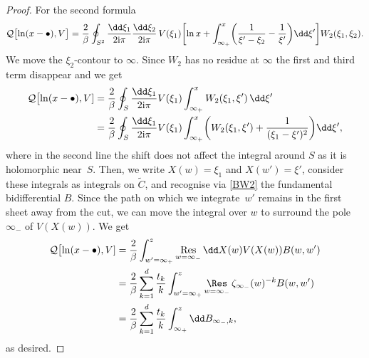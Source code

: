 \documentclass[pdftex]{sigma}
\numberwithin{equation}{section}
\begin{document}
\begin{proof}
For the second formula
\begin{equation*}
\mathcal{Q}\bigl[\ln(x - \bullet),V\bigr] = \frac{2}{\beta} \oint_{S^2} \frac{\dd \xi_1}{2{\rm i}\pi} \frac{\dd\xi_2}{2{\rm i}\pi}\,V(\xi_1)\biggl[\ln x + \int_{\infty_+}^{x} \biggl(\frac{1}{\xi' - \xi_2} - \frac{1}{\xi'}\biggr)\dd \xi'\biggr] W_2(\xi_1,\xi_2).
\end{equation*}
We move the $\xi_2$-contour to $\infty$. Since $W_2$ has no residue at $\infty$ the first and third term disappear and we get
\begin{align*}
\mathcal{Q}\bigl[\ln(x - \bullet),V] &{} = \frac{2}{\beta} \oint_{S} \frac{\dd \xi_1}{2{\rm i}\pi} V(\xi_1) \int_{\infty_+}^{x} W_2(\xi_1,\xi') \,\dd \xi' \\
&{} =\frac{2}{\beta} \oint_{S} \frac{\dd \xi_1}{2{\rm i}\pi} V(\xi_1) \int_{\infty_+}^{x} \biggl(W_2(\xi_1,\xi') + \frac{1}{(\xi_1 - \xi')^2}\biggr)\dd \xi',
\end{align*}
where in the second line the shift does not affect the integral around $S$ as it is holomorphic near~$S$. Then, we write $X(w) = \xi_1$ and $X(w') = \xi'$, consider these integrals as integrals on $\widetilde{C}$, and recognise via \eqref{BW2} the fundamental bidifferential $B$. Since the path on which we integrate~$w'$ remains in the first sheet away from the cut, we can move the integral over $w$ to surround the pole $\infty_-$ of $V(X(w))$. We get
\begin{align*}
\mathcal{Q}\bigl[\ln(x - \bullet),V] &{} = \frac{2}{\beta} \int_{w' = \infty_+}^{z} \mathop{{\rm Res}}_{w = \infty_-} \dd X(w)V(X(w))B(w,w') \\
&{} = \frac{2}{\beta} \sum_{k = 1}^{d} \frac{t_k}{k} \int_{w' = \infty_+}^{z} \mathop{{\rm \Res}}_{w = \infty_-} \zeta_{\infty_-}(w)^{-k} B(w,w') \\
&{} = \frac{2}{\beta} \sum_{k = 1}^{d} \frac{t_k}{k} \int_{\infty_+}^{z} \dd B_{\infty_-,k},
\end{align*}
as desired.


\end{proof}
\end{document}
